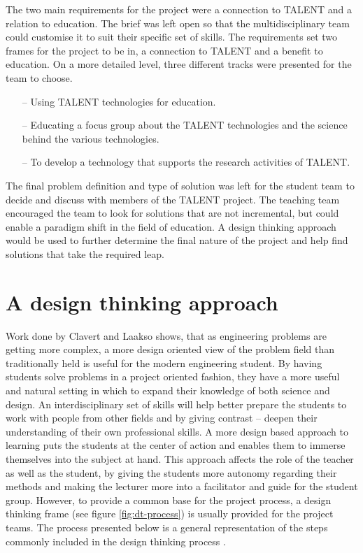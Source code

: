\documentclass[english,12pt,a4paper,pdftex]{article}
\begin{document}
The two main requirements for the project were a connection to TALENT and a relation to education. The brief was left  open so that the multidisciplinary team could customise it to suit their specific set of skills. The requirements set  two frames for the project to be in, a connection to TALENT and a benefit to education. On a more detailed level, three different tracks were presented for the team to choose.

\begin{itemize}
\item[--]Using TALENT technologies for education.
\item[--]Educating a focus group about the TALENT technologies and the science behind the various technologies.
\item[--]To develop a technology that supports the research activities of TALENT.
\end{itemize}

The final problem definition and type of solution was left for the student team to decide and discuss with members of the TALENT project. The teaching team encouraged the team to look for solutions that are not incremental, but could enable a paradigm shift in the field of education. A design thinking approach would be used to further determine the final nature of the project and help find solutions that take the required leap.


\clearpage

\section{A design thinking approach}

Work done by Clavert and Laakso \cite{Clavert} shows, that as engineering problems are getting more complex, a more design oriented view of the problem field than traditionally held is useful for the modern engineering student. By having students solve problems in a project oriented fashion, they have a more useful and natural setting in which to expand their knowledge of both science and design. An interdisciplinary set of skills will help better prepare the students to work with people from other fields and by giving contrast -- deepen their understanding of their own professional skills. A more design based approach to learning puts the students at the center of action and enables them to immerse themselves into the subject at hand. This approach affects the role of the teacher as well as the student, by giving the students more autonomy regarding their methods and making the lecturer more into a facilitator and guide for the student group. However, to provide a common base for the project process, a design thinking frame (see figure \ref{fig:dt-process}) is usually provided for the project teams. The process presented below is a general representation of the steps commonly included in the design thinking process \cite{Brown}. 
\end{document}
